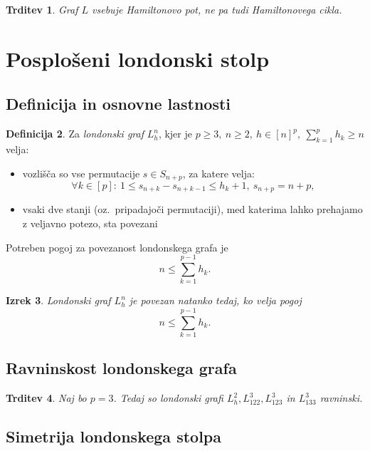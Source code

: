 \documentclass[12pt,a4paper]{amsart}
\theoremstyle{definition} %
\newtheorem{definicija}{Definicija}[section]
\theoremstyle{plain} %
\newtheorem{izrek}[definicija]{Izrek}
\newtheorem{trditev}[definicija]{Trditev}
\begin{document}
\bigskip

\begin{trditev}
    Graf $L$ vsebuje Hamiltonovo pot, ne pa tudi Hamiltonovega cikla.
\end{trditev}

\section{Posplošeni londonski stolp}

\subsection{Definicija in osnovne lastnosti}

\begin{definicija}
    Za \emph{londonski graf} $L_h^n$, kjer je $p \geq 3,\ n \geq 2,\ h \in [n]^p,\  \sum_{k=1}^p h_k \geq n$ velja:
    \begin{itemize}
        \item vozlišča so vse permutacije $s \in S_{n+p}$, za katere velja:
        \[\forall k \in [p]:\ 1 \leq s_{n+k} - s_{n+k-1} \leq h_k + 1,\ s_{n+p} = n + p ,\]
        \item vsaki dve stanji (oz.\ pripadajoči permutaciji), med katerima lahko prehajamo z veljavno potezo, sta povezani
    \end{itemize}
\end{definicija}

Potreben pogoj za povezanost londonskega grafa je 
\[ n \leq \sum_{k=1}^{p-1} h_k. \]
\begin{izrek}
    Londonski graf $L_h^n$ je povezan natanko tedaj, ko velja pogoj
    \[ n \leq \sum_{k=1}^{p-1} h_k. \]
\end{izrek}

\subsection{Ravninskost londonskega grafa}

\begin{trditev}
    Naj bo $p=3$. Tedaj so londonski grafi $L_h^2, L_{122}^3,L_{123}^3$ in $ L_{133}^3$ ravninski.
\end{trditev}

\subsection{Simetrija londonskega stolpa}

\end{document}

